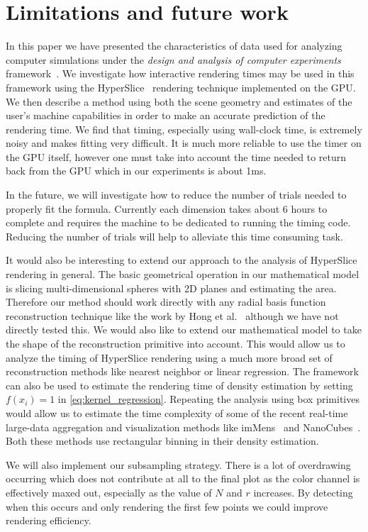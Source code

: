 \section{Limitations and future work}

In this paper we have presented the characteristics of data used for
analyzing computer simulations under the 
\emph{design and analysis of computer experiments} 
framework~\cite{Santner:2003}.  We investigate
how interactive rendering times may be used in this framework using the
HyperSlice~\cite{Wijk:1993} rendering technique implemented on the GPU.
We then describe a method using both the scene geometry and estimates of the
user's machine capabilities in order to make an accurate prediction of 
the rendering time.
We find that timing, especially using wall-clock time, is extremely noisy
and makes fitting very difficult.  It is much more reliable to use the
timer on the GPU itself, however one must take into account the time needed
to return back from the GPU which in our experiments is about 1ms.

In the future, we will investigate how to reduce the number of trials
needed to properly fit the formula.  Currently each dimension
takes about 6 hours to complete and requires the machine to be dedicated
to running the timing code.  Reducing the number of trials will help to
alleviate this time consuming task.

It would also be interesting to extend our approach to the analysis of
HyperSlice rendering in general. The basic geometrical operation in our
mathematical model is slicing multi-dimensional spheres with 2D planes and
estimating the area. Therefore our method should work directly with any radial
basis function reconstruction technique like the work by Hong et
al.~\cite{Hong:2006} although we have not directly tested this.  We would also
like to extend our mathematical model to take the shape of the reconstruction
primitive into account. This would allow us to analyze the timing of HyperSlice
rendering using a much more broad set of reconstruction methods like 
nearest neighbor or linear regression. 
The framework can also be used to estimate the rendering time of density
estimation by setting $f(x_i) = 1$ in \autoref{eq:kernel_regression}. Repeating the
analysis using box primitives would allow us to estimate the time complexity
of some of the recent real-time large-data aggregation and visualization 
methods like imMens~\cite{Liu:2013} and NanoCubes~\cite{Lins:2013}. Both these
methods use rectangular binning in their density estimation.

We will also implement our subsampling strategy.
There is a lot of overdrawing occurring which does not contribute at
all to the final plot as the color channel is effectively maxed out, 
especially as the value of $N$ and $r$ increases.  By detecting when this 
occurs and only rendering the first few points we could improve rendering
efficiency.

